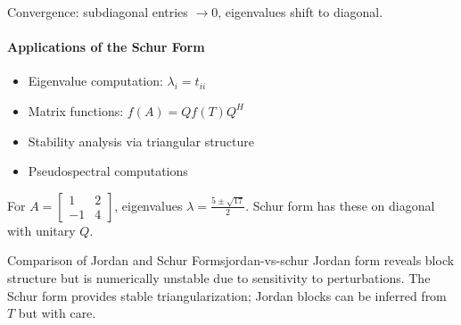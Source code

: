 Convergence: subdiagonal entries $\to 0$, eigenvalues shift to diagonal.

\paragraph{Applications of the Schur Form}

\begin{itemize}
    \item Eigenvalue computation: $\lambda_i = t_{ii}$
    \item Matrix functions: $f(A) = Q f(T) Q^H$
    \item Stability analysis via triangular structure
    \item Pseudospectral computations
\end{itemize}

\begin{example}{}
    For $A = \begin{bmatrix} 1 & 2 \\ -1 & 4 \end{bmatrix}$, eigenvalues $\lambda = \frac{5 \pm \sqrt{17}}{2}$. Schur form has these on diagonal with unitary $Q$.
\end{example}

\begin{remark}{Comparison of Jordan and Schur Forms}{jordan-vs-schur}
    Jordan form reveals block structure but is numerically unstable due to sensitivity to perturbations. The
    Schur form provides stable triangularization; Jordan blocks can be inferred from $T$ but with care.
\end{remark}

